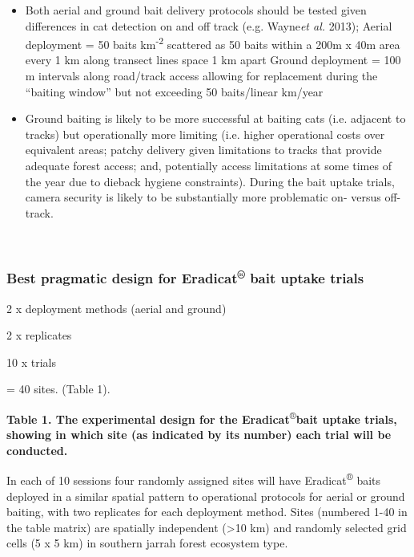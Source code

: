 \documentclass[version=last,
    paper=a4,                               %
    10pt,                                   %
    dvipsnames,
    oneside,                              %
    headings=openany,                       %
    open=any,
    BCOR=7mm,                               %
    DIV=15,     %
]{scrbook}
\begin{document}
\begin{itemize}
\itemsep1pt\parskip0pt
\item
  Both aerial and ground bait delivery protocols should be tested given
  differences in cat detection on and off track (e.g. Wayne\emph{et al.}
  2013); Aerial deployment = 50 baits km\textsuperscript{-2} scattered
  as 50 baits within a 200m x 40m area every 1 km along transect lines
  space 1 km apart Ground deployment = 100 m intervals along road/track
  access allowing for replacement during the ``baiting window'' but not
  exceeding 50 baits/linear km/year
\item
  Ground baiting is likely to be more successful at baiting cats (i.e.
  adjacent to tracks) but operationally more limiting (i.e. higher
  operational costs over equivalent areas; patchy delivery given
  limitations to tracks that provide adequate forest access; and,
  potentially access limitations at some times of the year due to
  dieback hygiene constraints). During the bait uptake trials, camera
  security is likely to be substantially more problematic on- versus
  off-track.
\end{itemize}

~

\subsubsection{Best pragmatic design for Eradicat\textsuperscript{®}
bait uptake trials}

2 x deployment methods (aerial and ground)

2 x replicates

10 x trials

= 40 sites. (Table 1).

\textbf{Table 1. The experimental design for the
Eradicat}\textsuperscript{®}\textbf{bait uptake trials, showing in which
site (as indicated by its number) each trial will be conducted.}

In each of 10 sessions four randomly assigned sites will have
Eradicat\textsuperscript{®} baits deployed in a similar spatial pattern
to operational protocols for aerial or ground baiting, with two
replicates for each deployment method. Sites (numbered 1-40 in the table
matrix) are spatially independent (\textgreater{}10 km) and randomly
selected grid cells (5 x 5 km) in southern jarrah forest ecosystem type.
\end{document}
